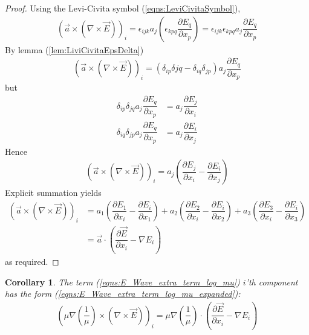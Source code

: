 \documentclass[12pt,twoside]{report}
\newtheorem{cor}{Corollary}[subsubsection]
\begin{document}
\begin{appendices}
\begin{proof}
Using the Levi-Civita symbol (\ref{eqns:LeviCivitaSymbol}), 
\begin{align*}
\left( \overrightarrow{a} \times (\nabla \times \overrightarrow{E}) \right)_i  = \epsilon_{ijk}a_j\left( \epsilon_{kpq}\dfrac{\partial E_q}{\partial x_p} \right) = \epsilon_{ijk} \epsilon_{kpq} a_j \dfrac{\partial E_q}{\partial x_p}
\end{align*}
By lemma (\ref{lem:LiviCivitaEpsDelta})
\begin{align*}
\left( \overrightarrow{a} \times (\nabla \times \overrightarrow{E}) \right)_i  =  \left( \delta_{ip}\delta{jq} - \delta_{iq}\delta_{jp}\right) a_j \dfrac{\partial E_q}{\partial x_p}
\end{align*}
but
\begin{align*}
\delta_{ip}\delta_{jq}a_j \dfrac{\partial E_q}{\partial x_p} &= a_j \dfrac{\partial E_j}{\partial x_i} \\
\delta_{iq}\delta_{jp}a_j \dfrac{\partial E_q}{\partial x_p} &= a_j \dfrac{\partial E_i}{\partial x_j}
\end{align*}
Hence
\begin{align*}
\left( \overrightarrow{a} \times (\nabla \times \overrightarrow{E}) \right)_i = a_j\left( \dfrac{\partial E_j}{\partial x_i} - \dfrac{\partial E_i}{\partial x_j} \right)
\end{align*}
Explicit summation yields
\begin{align*}
\left( \overrightarrow{a} \times (\nabla \times \overrightarrow{E}) \right)_i &= 
a_1\left( \dfrac{\partial E_1}{\partial x_i} - \dfrac{\partial E_i}{\partial x_1} \right) +
a_2\left( \dfrac{\partial E_2}{\partial x_i} - \dfrac{\partial E_i}{\partial x_2} \right) +
a_3\left( \dfrac{\partial E_3}{\partial x_i} - \dfrac{\partial E_i}{\partial x_3} \right) \\
&= \overrightarrow{a} \cdot \left( \dfrac{\partial \overrightarrow{E}}{\partial x_i}- \nabla E_i \right)
\end{align*}
as required.
\end{proof}

\begin{cor}
The term (\ref{eqns:E_Wave_extra_term_log_mu}) $i$'th component has the form (\ref{eqns:E_Wave_extra_term_log_mu_expanded}):
\begin{align*}
\left(\mu \nabla \left( \dfrac{1}{\mu}\right) \times \left(\nabla \times \overrightarrow{E} \right) \right)_i = 
\mu \nabla \left(\dfrac{1}{\mu} \right) \cdot \left( \dfrac{\partial \overrightarrow{E}}{\partial x_i}- \nabla E_i \right)
\end{align*}
\end{cor}




\end{appendices}
\end{document}
